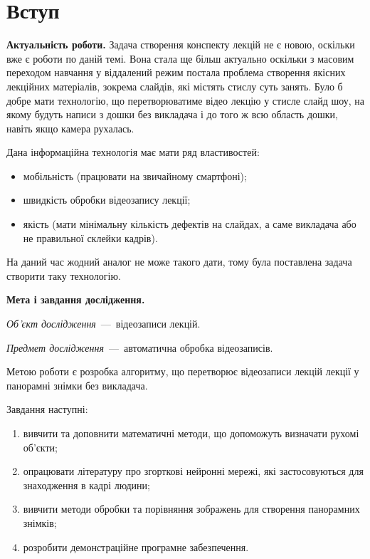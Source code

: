 \chapter*{Вступ}

\textbf{Актуальність роботи.}
Задача створення конспекту лекцій не є новою, оскільки вже є
роботи по даній темі. Вона стала ще більш актуально оскільки
з масовим переходом навчання у віддалений режим
постала проблема створення якісних
лекційних матеріалів, зокрема слайдів, які містять
стислу суть занять. Було б добре мати технологію, що
перетворюватиме відео лекцію у стисле слайд шоу, на
якому будуть написи з дошки без викладача і до того
ж всю область дошки, навіть якщо камера
рухалась. 

Дана інформаційна технологія має мати ряд властивостей:
\begin{itemize}
      \item мобільність (працювати на звичайному смартфоні);
      \item швидкість обробки відеозапису лекції;
      \item якість (мати мінімальну кількість дефектів на слайдах, 
      а саме викладача або не правильної склейки кадрів).
\end{itemize}
На даний час жодний аналог не може такого дати, тому була поставлена
задача створити таку технологію.

\textbf{Мета і завдання дослідження.}

\textit{Об'єкт дослідження}~---~відеозаписи лекцій.

\textit{Предмет дослідження}~---~автоматична обробка
відеозаписів.

Метою роботи є розробка алгоритму, що перетворює відеозаписи лекцій
лекції у панорамні знімки без викладача.

Завдання наступні:
\begin{enumerate}
      \item
            вивчити та доповнити математичні методи,
            що допоможуть визначати рухомі об'єкти;
      \item
            опрацювати літературу про згорткові нейронні мережі, які застосовуються
            для знаходження в кадрі людини;
      \item
            вивчити методи обробки та порівняння зображень для створення панорамних знімків;
      \item
            розробити демонстраційне програмне забезпечення.
\end{enumerate}

